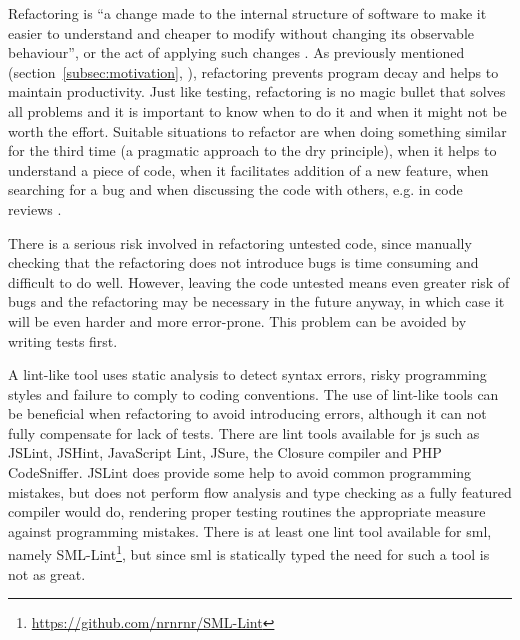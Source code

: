 \documentclass[11pt]{article}
\begin{document}
Refactoring is ``a change made to the internal structure of software to make it easier to understand and cheaper to modify without changing its observable behaviour'', or the act of applying such changes \cite[p.~46]{Refactoring}. As previously mentioned (section~\ref{subsec:motivation}, ), refactoring prevents program decay and helps to maintain productivity. Just like testing, refactoring is no magic bullet that solves all problems and it is important to know when to do it and when it might not be worth the effort. Suitable situations to refactor are when doing something similar for the third time (a pragmatic approach to the \gls{dry} principle), when it helps to understand a piece of code, when it facilitates addition of a new feature, when searching for a bug and when discussing the code with others, e.g. in code reviews \cite[p.~49-51]{Refactoring}.

There is a serious risk involved in refactoring untested code\cite[p.~17]{Refactoring}, since manually checking that the refactoring does not introduce bugs is time consuming and difficult to do well. However, leaving the code untested means even greater risk of bugs and the refactoring may be necessary in the future anyway, in which case it will be even harder and more error-prone. This problem can be avoided by writing tests first.

A lint-like tool uses static analysis to detect syntax errors, risky programming styles and failure to comply to coding conventions. The use of lint-like tools can be beneficial when refactoring to avoid introducing errors, although it can not fully compensate for lack of tests. There are lint tools available for \gls{js} such as JSLint, JSHint, JavaScript Lint, JSure, the Closure compiler and PHP CodeSniffer. JSLint does provide some help to avoid common programming mistakes, but does not perform flow analysis \cite{JSLint} and type checking as a fully featured compiler would do, rendering proper testing routines the appropriate measure against programming mistakes. There is at least one lint tool available for \gls{sml}, namely SML-Lint\footnote{\url{https://github.com/nrnrnr/SML-Lint}}, but since \gls{sml} is statically typed the need for such a tool is not as great.
\end{document}
